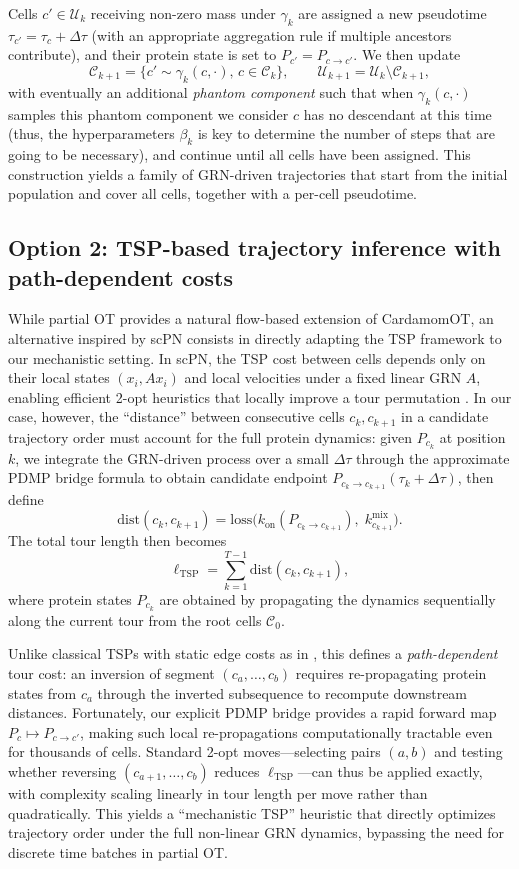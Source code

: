 \documentclass[10pt]{article}
\begin{document}
Cells $c'\in\mathcal{U}_k$ receiving non-zero mass under $\gamma_k$ are assigned a new pseudotime $\tau_{c'} = \tau_c + \Delta\tau$ (with an appropriate aggregation rule if multiple ancestors contribute), and their protein state is set to $P_{c'} = P_{c\to c'}$. We then update
\[
\mathcal{C}_{k+1} = \{c' \sim \gamma_k(c,\cdot),\, c \in \mathcal{C}_{k}\},\qquad
\mathcal{U}_{k+1} = \mathcal{U}_k \setminus \mathcal{C}_{k+1},
\]
with eventually an additional \emph{phantom component} such that when $\gamma_k(c,\cdot)$ samples this phantom component we consider $c$ has no descendant at this time (thus, the hyperparameters $\beta_k$ is key to determine the number of steps that are going to be necessary), and continue until all cells have been assigned. This construction yields a family of GRN-driven trajectories that start from the initial population and cover all cells, together with a per-cell pseudotime. 

\subsection{Option 2: TSP-based trajectory inference with path-dependent costs}

While partial OT provides a natural flow-based extension of CardamomOT, an alternative inspired by scPN consists in directly adapting the TSP framework to our mechanistic setting. In scPN, the TSP cost between cells depends only on their local states $(x_i,Ax_i)$ and local velocities under a fixed linear GRN $A$, enabling efficient 2-opt heuristics that locally improve a tour permutation \cite{Zhou2025}. In our case, however, the ``distance'' between consecutive cells $c_k,c_{k+1}$ in a candidate trajectory order must account for the full protein dynamics: given $P_{c_k}$ at position $k$, we integrate the GRN-driven process
over a small $\Delta\tau$ through the approximate PDMP bridge formula to obtain candidate endpoint $P_{c_k\to c_{k+1}}(\tau_k+\Delta\tau)$, then define
\[
\mathrm{dist}(c_k,c_{k+1}) = \mathrm{loss}\bigl(k_{\mathrm{on}}(P_{c_k\to c_{k+1}}),\;k^{\mathrm{mix}}_{c_{k+1}}\bigr).
\]
The total tour length then becomes
\[
\ell_{\mathrm{TSP}} = \sum_{k=1}^{T-1} \mathrm{dist}(c_k,c_{k+1}),
\]
where protein states $P_{c_k}$ are obtained by propagating the dynamics sequentially along the current tour from the root cells $\mathcal{C}_0$.

Unlike classical TSPs with static edge costs as in \cite{Zhou2025}, this defines a \emph{path-dependent} tour cost: an inversion of segment $(c_a,\dots,c_b)$ requires re-propagating protein states from $c_a$ through the inverted subsequence to recompute downstream distances. Fortunately, our explicit PDMP bridge provides a rapid forward map $P_c\mapsto P_{c\to c'}$, making such local re-propagations computationally tractable even for thousands of cells. Standard 2-opt moves---selecting pairs $(a,b)$ and testing whether reversing $(c_{a+1},\dots,c_b)$ reduces $\ell_{\mathrm{TSP}}$---can thus be applied exactly, with complexity scaling linearly in tour length per move rather than quadratically. This yields a ``mechanistic TSP'' heuristic that directly optimizes trajectory order under the full non-linear GRN dynamics, bypassing the need for discrete time batches in partial OT.
\end{document}

